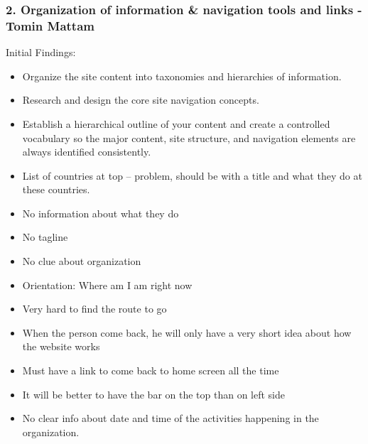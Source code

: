 \documentclass[12pt]{article}
\begin{document}
\subsubsection*{2. Organization of information \& navigation tools and links - Tomin Mattam}
Initial Findings:
\begin{itemize}
\item Organize the site content into taxonomies and hierarchies of information.
\item Research and design the core site navigation concepts.
\item Establish a hierarchical outline of your content and create a controlled vocabulary so the major content, site structure, and navigation elements are always identified consistently.
\item List of countries at top – problem, should be with a title and what they do at these countries.
\item No information about what they do 
\item No tagline 
\item No clue about organization
\item Orientation: Where am I am right now
\item Very hard to find the route to go 
\item When the person come back, he will only have a very short idea about how the website works 
\item Must have a link to come back to home screen all the time 

\item It will be better to have the bar on the top than on left side 
\item No clear info about date and time of the activities happening in the organization.
\end{itemize}
\end{document}
